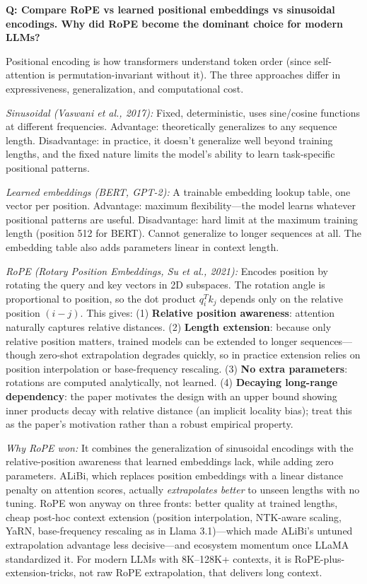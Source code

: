 \begin{interviewq}
\textbf{Q: Compare RoPE vs learned positional embeddings vs sinusoidal encodings. Why did RoPE become the dominant choice for modern LLMs?}

 \quad {} \quad \badgefreq{\freqmed}

\stronganswer Positional encoding is how transformers understand token order (since self-attention is permutation-invariant without it). The three approaches differ in expressiveness, generalization, and computational cost.

\textit{Sinusoidal (Vaswani et al., 2017):} Fixed, deterministic, uses sine/cosine functions at different frequencies. Advantage: theoretically generalizes to any sequence length. Disadvantage: in practice, it doesn't generalize well beyond training lengths, and the fixed nature limits the model's ability to learn task-specific positional patterns.

\textit{Learned embeddings (BERT, GPT-2):} A trainable embedding lookup table, one vector per position. Advantage: maximum flexibility---the model learns whatever positional patterns are useful. Disadvantage: hard limit at the maximum training length (position 512 for BERT). Cannot generalize to longer sequences at all. The embedding table also adds parameters linear in context length.

\textit{RoPE (Rotary Position Embeddings, Su et al., 2021):} Encodes position by rotating the query and key vectors in 2D subspaces. The rotation angle is proportional to position, so the dot product $q_i^T k_j$ depends only on the relative position $(i - j)$. This gives: (1) \textbf{Relative position awareness}: attention naturally captures relative distances. (2) \textbf{Length extension}: because only relative position matters, trained models can be extended to longer sequences---though zero-shot extrapolation degrades quickly, so in practice extension relies on position interpolation or base-frequency rescaling. (3) \textbf{No extra parameters}: rotations are computed analytically, not learned. (4) \textbf{Decaying long-range dependency}: the paper motivates the design with an upper bound showing inner products decay with relative distance (an implicit locality bias); treat this as the paper's motivation rather than a robust empirical property.

\textit{Why RoPE won:} It combines the generalization of sinusoidal encodings with the relative-position awareness that learned embeddings lack, while adding zero parameters. ALiBi, which replaces position embeddings with a linear distance penalty on attention scores, actually \emph{extrapolates better} to unseen lengths with no tuning. RoPE won anyway on three fronts: better quality at trained lengths, cheap post-hoc context extension (position interpolation, NTK-aware scaling, YaRN, base-frequency rescaling as in Llama 3.1)---which made ALiBi's untuned extrapolation advantage less decisive---and ecosystem momentum once LLaMA standardized it. For modern LLMs with 8K--128K+ contexts, it is RoPE-plus-extension-tricks, not raw RoPE extrapolation, that delivers long context.


\end{interviewq}
